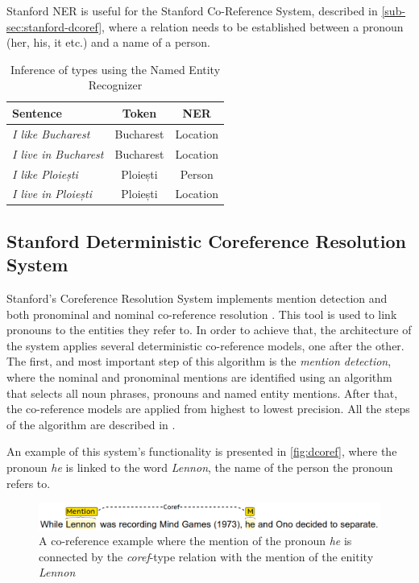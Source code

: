 Stanford NER is useful for the Stanford Co-Reference System, described in \autoref{sub-sec:stanford-dcoref}, where a relation needs to be established between a pronoun (her, his, it etc.) and a name of a person.

\begin{table}[htb, width=\textwidth]
  \centering
  \begin{tabular}{lcc}
    Sentence & Token & NER \\
    \hline
    {\em I like Bucharest} & Bucharest & Location \\
    {\em I live in Bucharest} & Bucharest & Location \\
    {\em I like Ploiești} & Ploiești & Person \\
    {\em I live in Ploiești} & Ploiești & Location \\
  \end{tabular}
  \caption{Inference of types using the Named Entity Recognizer}
  \label{table:stanford-ner}
\end{table}

\subsection{Stanford Deterministic Coreference Resolution System}
\label{sub-sec:stanford-dcoref}

Stanford's Coreference Resolution System implements mention detection and both pronominal and nominal co-reference resolution \cite{Manning2014}. This tool is used to link pronouns to the entities they refer to. In order to achieve that, the architecture of the system applies several deterministic co-reference models, one after the other. The first, and most important step of this algorithm is the {\em mention detection}, where the nominal and pronominal mentions are identified using an algorithm that selects all noun phrases, pronouns and named entity mentions. After that, the co-reference models are applied from highest to lowest precision. All the steps of the algorithm are described in \cite{Lee2013}.

An example of this system's functionality is presented in \autoref{fig:dcoref}, where the pronoun {\em he} is linked to the word {\em Lennon}, the name of the person the pronoun refers to.

\begin{figure}[htb]
  \centering
  \captionsetup{justification=centering}
  \includegraphics[width=\textwidth]{src/img/dcoref.png}
  \caption[A co-reference example]{A co-reference example where the mention of the pronoun {\em he} is connected by the {\em coref}-type relation with the mention of the enitity {\em Lennon}}
  \label{fig:dcoref}
\end{figure}

\pagebreak

